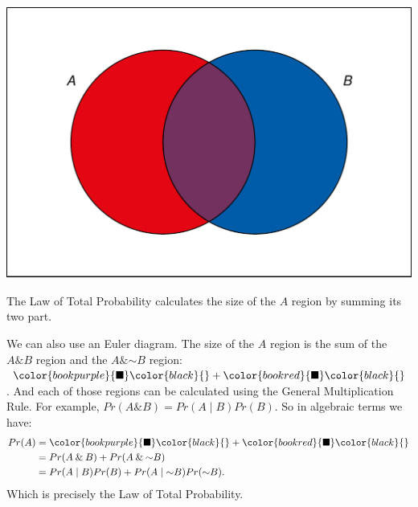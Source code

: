 \documentclass[justified]{tufte-book}
\newcommand{\given}{\mid}
\renewcommand{\neg}{\mathbin{\sim}}
\renewcommand{\wedge}{\mathbin{\&}}
\newcommand{\p}{Pr}
\theoremstyle{definition}
\theoremstyle{definition}
\theoremstyle{definition}
\theoremstyle{remark}
\begin{document}
\begin{marginfigure}
\includegraphics{_main_files/figure-latex/unnamed-chunk-73-1} \caption[The Law of Total Probability calculates the size of the $A$ region by summing its two part]{The Law of Total Probability calculates the size of the $A$ region by summing its two part.}\label{fig:unnamed-chunk-73}
\end{marginfigure}

We can also use an Euler diagram. The size of the \(A\) region is the sum of the \(A \wedge B\) region and the \(A \wedge \neg B\) region: \(\color{bookpurple}{\blacksquare}\color{black}{} + \color{bookred}{\blacksquare}\color{black}{}\). And each of those regions can be calculated using the General Multiplication Rule. For example, \(\p(A \wedge B) = \p(A \given B) \p(B)\). So in algebraic terms we have:
\[
  \begin{aligned}
    \p(A) &= \color{bookpurple}{\blacksquare}\color{black}{} 
             + \color{bookred}{\blacksquare}\color{black}{}\\
          &= \p(A \wedge B) + \p(A \wedge \neg B)\\
          &= \p(A \given B) \p(B) + \p(A \given \neg B) \p(\neg B).
  \end{aligned}
\]
Which is precisely the Law of Total Probability.
\end{document}
